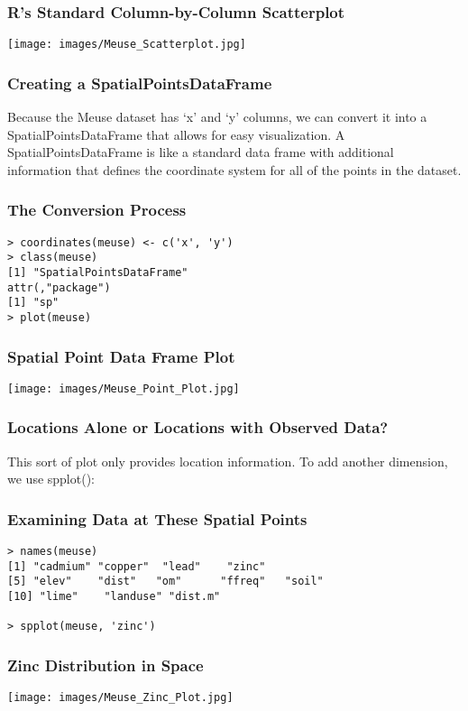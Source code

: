 \documentclass{beamer}
\begin{document}
\frame
{
	\frametitle{R's Standard Column-by-Column Scatterplot}
	
	\begin{center}
		\texttt{[image: images/Meuse\_Scatterplot.jpg]}
	\end{center}
}

\frame
{
	\frametitle{Creating a SpatialPointsDataFrame}
	
	Because the Meuse dataset has `x' and `y' columns, we can convert it into a SpatialPointsDataFrame that allows for easy visualization. A SpatialPointsDataFrame is like a standard data frame with additional information that defines the coordinate system for all of the points in the dataset.
}

\begin{frame}[fragile]
	\frametitle{The Conversion Process}
	
	\begin{verbatim}
> coordinates(meuse) <- c('x', 'y')
> class(meuse)
[1] "SpatialPointsDataFrame"
attr(,"package")
[1] "sp"
> plot(meuse)
	\end{verbatim}
\end{frame}

\frame
{	
	\frametitle{Spatial Point Data Frame Plot}
	
	\begin{center}
		\texttt{[image: images/Meuse\_Point\_Plot.jpg]}
	\end{center}
}

\frame
{
	\frametitle{Locations Alone or Locations with Observed Data?}
	
	This sort of plot only provides location information. To add another dimension, we use spplot():
}

\begin{frame}[fragile]
	\frametitle{Examining Data at These Spatial Points}

	\begin{verbatim}
> names(meuse)
[1] "cadmium" "copper"  "lead"    "zinc"
[5] "elev"    "dist"   "om"      "ffreq"   "soil"
[10] "lime"    "landuse" "dist.m"

> spplot(meuse, 'zinc')
	\end{verbatim}
\end{frame}

\frame
{	
	\frametitle{Zinc Distribution in Space}
	
	\begin{center}
		\texttt{[image: images/Meuse\_Zinc\_Plot.jpg]}
	\end{center}
}
\end{document}
